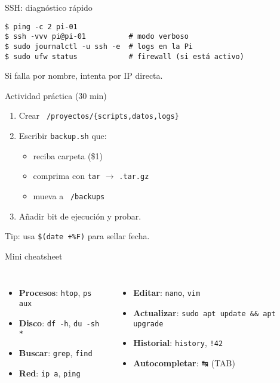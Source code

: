 \documentclass[aspectratio=169,professionalfonts]{beamer}
\begin{document}
\begin{frame}[fragile]{SSH: diagnóstico rápido}
\begin{verbatim}
$ ping -c 2 pi-01
$ ssh -vvv pi@pi-01          # modo verboso
$ sudo journalctl -u ssh -e  # logs en la Pi
$ sudo ufw status            # firewall (si está activo)
\end{verbatim}
\begin{infobox}
Si falla por nombre, intenta por IP directa.
\end{infobox}
\end{frame}


\begin{frame}{Actividad práctica (30 min)}
\begin{enumerate}
  \item Crear \texttt{~/proyectos/\{scripts,datos,logs\}}
  \item Escribir \texttt{backup.sh} que:
    \begin{itemize}
      \item reciba carpeta (\$1)
      \item comprima con \texttt{tar} \(\to\) \texttt{.tar.gz}
      \item mueva a \texttt{~/backups}
    \end{itemize}
  \item Añadir bit de ejecución y probar.
\end{enumerate}

\small\faLightbulb\; Tip: usa \texttt{\$(date +\%F)} para sellar fecha.
\end{frame}

\begin{frame}[fragile]{Mini cheatsheet}
\begin{columns}[T,onlytextwidth]
\begin{itemize}
  \item \textbf{Procesos}: \texttt{htop}, \texttt{ps aux}
  \item \textbf{Disco}: \texttt{df -h}, \texttt{du -sh *}
  \item \textbf{Buscar}: \texttt{grep}, \texttt{find}
  \item \textbf{Red}: \texttt{ip a}, \texttt{ping}
\end{itemize}

\begin{itemize}
  \item \textbf{Editar}: \texttt{nano}, \texttt{vim}
  \item \textbf{Actualizar}: \texttt{sudo apt update && apt upgrade}
  \item \textbf{Historial}: \texttt{history}, \texttt{!42}
  \item \textbf{Autocompletar}: ↹ (TAB)
\end{itemize}
\end{columns}
\end{frame}
\end{document}
